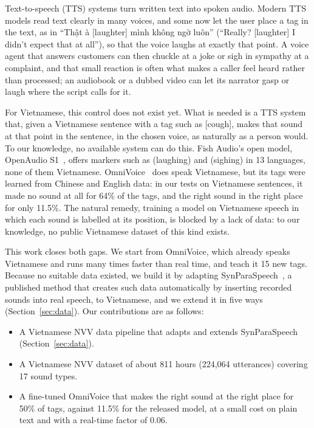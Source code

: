 \documentclass[a4paper]{article}
\begin{document}
Text-to-speech (TTS) systems turn written text into spoken audio. Modern TTS models read text
clearly in many voices, and some now let the user place a tag in the text, as in ``Thật à
[laughter] mình không ngờ luôn'' (``Really? [laughter] I didn't expect that at all''), so that
the voice laughs at exactly that point. A voice agent that answers customers can then chuckle at
a joke or sigh in sympathy at a complaint, and that small reaction is often what makes a caller
feel heard rather than processed; an audiobook or a dubbed video can let its narrator gasp or
laugh where the script calls for it.

For Vietnamese, this control does not exist yet. What is needed is a TTS system that, given a
Vietnamese sentence with a tag such as [cough], makes that sound at that point in the sentence,
in the chosen voice, as naturally as a person would. To our knowledge, no available system can
do this. Fish Audio's open model, OpenAudio S1~\citep{openaudios1}, offers markers such as
(laughing) and (sighing) in 13 languages, none of them Vietnamese. OmniVoice~\citep{omnivoice}
does speak Vietnamese, but its tags were learned from Chinese and English data: in our tests on
Vietnamese sentences, it made no sound at all for 64\% of the tags, and the right sound in the
right place for only 11.5\%. The natural remedy, training a model on Vietnamese speech in which
each sound is labelled at its position, is blocked by a lack of data: to our knowledge, no
public Vietnamese dataset of this kind exists.

This work closes both gaps. We start from OmniVoice, which already speaks Vietnamese and runs
many times faster than real time, and teach it 15 new tags. Because no suitable data existed,
we build it by adapting SynParaSpeech~\citep{synparaspeech}, a published method that creates
such data automatically by inserting recorded sounds into real speech, to Vietnamese, and we
extend it in five ways (Section~\ref{sec:data}). Our contributions are as follows:
\begin{itemize}
\item A Vietnamese NVV data pipeline that adapts and extends SynParaSpeech (Section~\ref{sec:data}).
\item A Vietnamese NVV dataset of about 811 hours (224,064 utterances) covering 17 sound types.
\item A fine-tuned OmniVoice that makes the right sound at the right place for 50\% of tags,
  against 11.5\% for the released model, at a small cost on plain text and with a real-time
  factor of 0.06.
\end{itemize}
\end{document}
